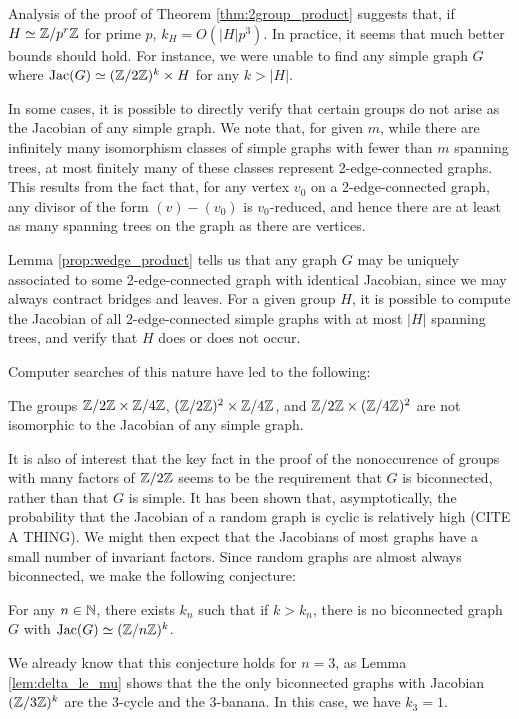 \documentclass{amsart}
\begin{document}
Analysis of the proof of Theorem \ref{thm:2group_product} suggests
that, if $H \simeq \mathbb{Z}/p^r\mathbb{Z}$ for prime $p$, $k_H = O(|H|p^3)$. In
practice, it seems that much better bounds should hold. For instance,
we were unable to find any simple graph $G$ where $\operatorname{Jac}(G) \simeq
(\mathbb{Z}/2\mathbb{Z})^k \times H$ for any $k > |H|$.

In some cases, it is possible to directly verify that certain groups
do not arise as the Jacobian of any simple graph. We note that, for
given $m$, while there are infinitely many isomorphism classes of
simple graphs with fewer than $m$ spanning trees, at most finitely
many of these classes represent 2-edge-connected graphs. This results
from the fact that, for any vertex $v_0$ on a 2-edge-connected graph,
any divisor of the form $(v) - (v_0)$ is $v_0$-reduced, and hence
there are at least as many spanning trees on the graph as there are
vertices.  

Lemma \ref{prop:wedge_product} tells us that any graph $G$ may be
uniquely associated to some 2-edge-connected graph with identical
Jacobian, since we may always contract bridges and leaves. For a given
group $H$, it is possible to compute the Jacobian of all
2-edge-connected simple graphs with at most $|H|$ spanning trees, and
verify that $H$ does or does not occur.

Computer searches of this nature have led to the following:

\begin{thm}
  The groups $\mathbb{Z}/2\mathbb{Z} \times \mathbb{Z}/4\mathbb{Z}$, $(\mathbb{Z}/2\mathbb{Z})^2 \times \mathbb{Z}/4\mathbb{Z}$, and
  $\mathbb{Z}/2\mathbb{Z} \times (\mathbb{Z}/4\mathbb{Z})^2$ are not isomorphic to the Jacobian of any
  simple graph.
\end{thm}

It is also of interest that the key fact in the proof of the
nonoccurence of groups with many factors of $\mathbb{Z}/2\mathbb{Z}$ seems to be the
requirement that $G$ is biconnected, rather than that $G$ is
simple. It has been shown that, asymptotically, the probability that
the Jacobian of a random graph is cyclic is relatively high (CITE A
THING). We might then expect that the Jacobians of most graphs have a
small number of invariant factors. Since random graphs are almost
always biconnected, we make the following conjecture:

\begin{conj}
  For any $n \in \mathbb{N}$, there exists $k_n$ such that if $k > k_n$, there
  is no biconnected graph $G$ with $\operatorname{Jac}(G) \simeq (\mathbb{Z}/n\mathbb{Z})^k$.
\end{conj}

We already know that this conjecture holds for $n=3$, as Lemma
\ref{lem:delta_le_mu} shows that the the only biconnected graphs with
Jacobian $(\mathbb{Z}/3\mathbb{Z})^k$ are the $3$-cycle and the $3$-banana. In this
case, we have $k_3 = 1$.
\end{document}
